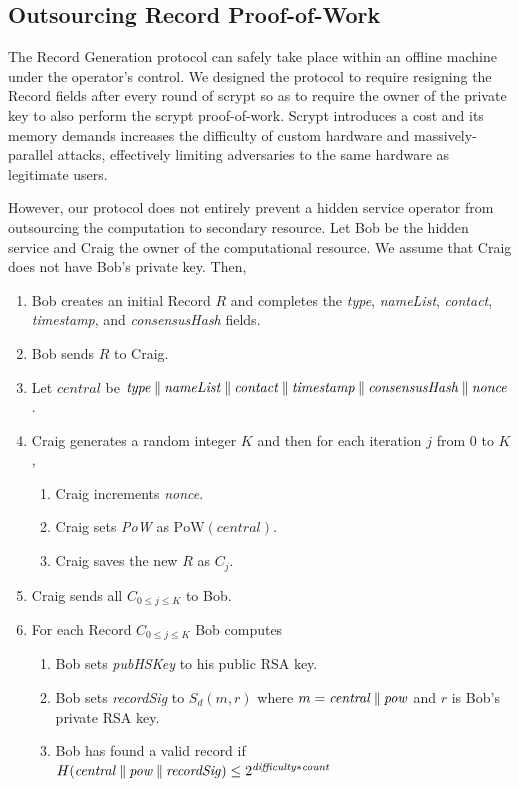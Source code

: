 \subsection{Outsourcing Record Proof-of-Work}

The Record Generation protocol can safely take place within an offline machine under the operator's control. We designed the protocol to require resigning the Record fields after every round of scrypt so as to require the owner of the private key to also perform the scrypt proof-of-work. Scrypt introduces a cost and its memory demands increases the difficulty of custom hardware and massively-parallel attacks, effectively limiting adversaries to the same hardware as legitimate users. 

However, our protocol does not entirely prevent a hidden service operator from outsourcing the computation to secondary resource. Let Bob be the hidden service and Craig the owner of the computational resource. We assume that Craig does not have Bob's private key. Then,

\begin{enumerate}
	\item Bob creates an initial Record $ R $ and completes the \emph{type}, \emph{nameList}, \emph{contact}, \emph{timestamp}, and \emph{consensusHash} fields.
	\item Bob sends $ R $ to Craig.
	\item Let $ \mathit{central} $ be $\mathit{type} \mathbin{\|} \mathit{nameList} \mathbin{\|} \mathit{contact} \mathbin{\|} \mathit{timestamp} \mathbin{\|} \mathit{consensusHash} \mathbin{\|} \mathit{nonce} $.
	\item Craig generates a random integer $ K $ and then for each iteration $ j $ from 0 to $ K $,
		\begin{enumerate}
			\item Craig increments \emph{nonce}.
			\item Craig sets \emph{PoW} as $ \mathrm{PoW}(\mathit{central}) $.
			\item Craig saves the new $ R $ as $ C_{j} $.
		\end{enumerate}
	\item Craig sends all $ C_{0 \le j \le K} $ to Bob.
	\item For each Record $ C_{0 \le j \le K} $ Bob computes
		\begin{enumerate}
			\item Bob sets \emph{pubHSKey} to his public RSA key.
			\item Bob sets \emph{recordSig} to $ S_{d}(m, r) $ where $ m = \mathit{central} \mathbin{\|} \mathit{pow} $ and $ r $ is Bob's private RSA key.
			\item Bob has found a valid record if $ H(\mathit{central} \mathbin{\|} \mathit{pow} \mathbin{\|} \mathit{recordSig}) \leq 2^{\mathit{difficulty} * \mathit{count}} $
		\end{enumerate}
\end{enumerate}

